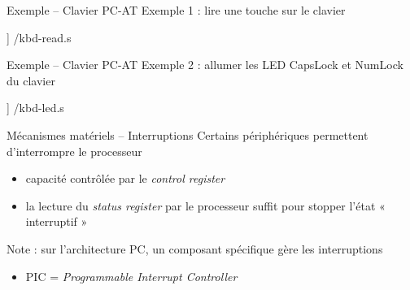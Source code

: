 \begin {frame} {Exemple -- Clavier PC-AT}
    Exemple 1 : lire une touche sur le clavier

    \fD\lstmonstyle] {\inc/kbd-read.s}
\end {frame}

\begin {frame} {Exemple -- Clavier PC-AT}
    Exemple 2 : allumer les LED CapsLock et NumLock du clavier

    \fD\lstmonstyle] {\inc/kbd-led.s}
\end {frame}

\begin {frame} {Mécanismes matériels -- Interruptions}
    Certains périphériques permettent d'interrompre le processeur

    \begin {itemize}
	\item capacité contrôlée par le \textit {control register}
	\item la lecture du \textit {status register} par le processeur
	    suffit pour stopper l'état « interruptif »
    \end {itemize}

    \vspace* {3mm}

    Note : sur l'architecture PC, un composant spécifique gère les
    interruptions

    \begin {itemize}
	\item PIC = \textit {Programmable Interrupt Controller}
    \end {itemize}
\end {frame}

